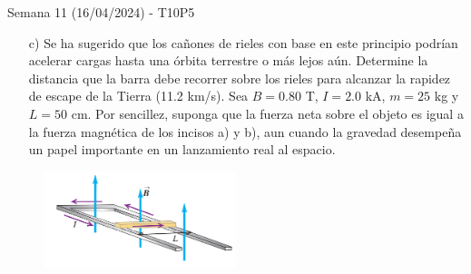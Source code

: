 \begin{frame}{Semana 11 (16/04/2024) - T10P5}

\begin{itemize}
    \item[c)] Se ha sugerido que los cañones de rieles con base
en este principio podrían acelerar cargas hasta una órbita terrestre o
más lejos aún. Determine la distancia que la barra debe recorrer sobre
los rieles para alcanzar la rapidez de escape de la Tierra (11.2 km/s). Sea $B = 0.80$ T, $I = 2.0$ kA, $m = 25$ kg y $L = 50$ cm. Por sencillez,
suponga que la fuerza neta sobre el objeto es igual a la fuerza magnética de los incisos a) y b), aun cuando la gravedad desempeña un
papel importante en un lanzamiento real al espacio.
\end{itemize}

\begin{figure}
    \centering
    \includegraphics[width=0.5\textwidth]{figures/t10p5.png}
\end{figure}
    
\end{frame}

